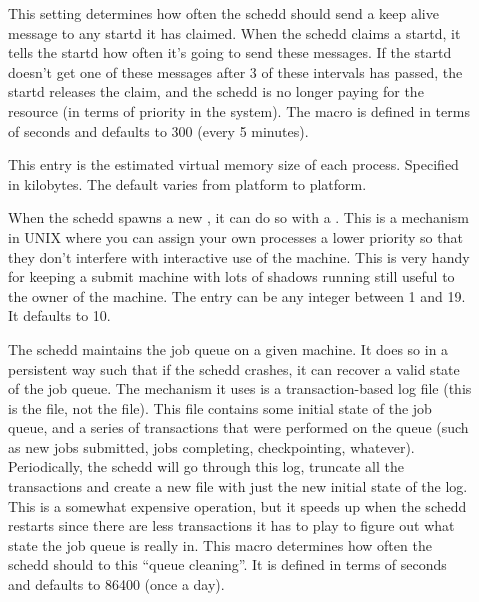 \begin{description}
\item[] \label{param:AliveInterval} This
  setting determines how often the schedd should send a keep alive
  message to any startd it has claimed.  When the schedd claims a
  startd, it tells the startd how often it's going to send these
  messages.  If the startd doesn't get one of these messages after 3
  of these intervals has passed, the startd releases the claim, and
  the schedd is no longer paying for the resource (in terms of
  priority in the system).  The macro is defined in terms of seconds
  and defaults to 300 (every 5 minutes).

\item[] \label{param:ShadowSizeEstimate}
  This entry is the estimated virtual memory size of each
   process.  Specified in kilobytes.  The default
  varies from platform to platform.

\item[]
  \label{param:ShadowReniceIncrement} When the schedd spawns a new
  , it can do so with a .  This is a
  mechanism in UNIX where you can assign your own processes a lower 
  priority so that they don't interfere with interactive use of the
  machine.  This is very handy for keeping a submit machine with lots
  of shadows running still useful to the owner of the machine.  The
  entry can be any integer between 1 and 19.  It defaults to 10.

\item[] \label{param:QueueCleanInterval}
  The schedd maintains the job queue on a given machine.  It does so
  in a persistent way such that if the schedd crashes, it can recover
  a valid state of the job queue.  The mechanism it uses is a
  transaction-based log file (this is the  file,
  not the  file).  This file contains some initial
  state of the job queue, and a series of transactions that were
  performed on the queue (such as new jobs submitted, jobs completing,
  checkpointing, whatever).  Periodically, the schedd will go through
  this log, truncate all the transactions and create a new file with
  just the new initial state of the log.  This is a somewhat expensive
  operation, but it speeds up when the schedd restarts since there are
  less transactions it has to play to figure out what state the job
  queue is really in.  This macro determines how often the schedd
  should to this ``queue cleaning''.  It is defined in terms of
  seconds and defaults to 86400 (once a day). 
  

\end{description}
